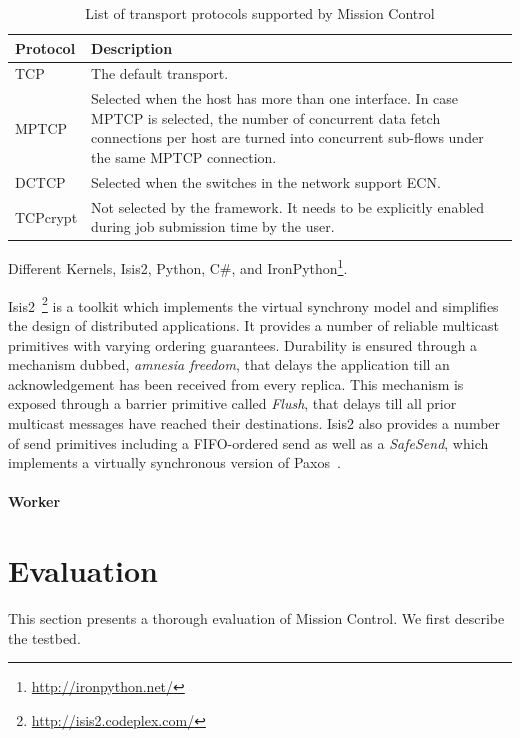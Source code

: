 \documentclass[a4paper,12pt,twoside,openright]{report}
\begin{document}
\begin{table}
  \centering
  \begin{tabularx}{5in}{|X|X|} 
    \hline
	\textbf{Protocol} & \textbf{Description} \\ \hline \hline
    TCP & The default transport. \\ \hline
    MPTCP & Selected when the host has more than one interface. In case MPTCP is
    selected, the number of concurrent data fetch connections per host are
    turned into concurrent sub-flows under the same MPTCP connection.
    \\ \hline 
    DCTCP & Selected when the switches in the network support ECN.
    \\ \hline
    TCPcrypt & Not selected by the framework. It needs to be explicitly enabled
    during job submission time by the user.
    \\
    \hline
 \end{tabularx} 
  \caption{List of transport protocols supported by Mission Control}
  \label{chap:implem:sec:ciel:tab:protocols}
\end{table}

Different Kernels, Isis2, Python, C\#, and
IronPython\footnote{\url{http://ironpython.net/}}.

Isis2~\cite{Birman:2012:OCW}\footnote{\url{http://isis2.codeplex.com/}} is a
toolkit which implements the virtual synchrony model and simplifies the design
of distributed applications. It provides a number of reliable multicast
primitives with varying ordering guarantees. Durability is ensured through a
mechanism dubbed, \emph{amnesia freedom}, that delays the application till an
acknowledgement has been received from every replica. This mechanism is exposed
through a barrier primitive called \emph{Flush}, that delays till all prior
multicast messages have reached their destinations. Isis2 also provides a number
of send primitives including a FIFO-ordered send as well as a \emph{SafeSend},
which implements a virtually synchronous version of
Paxos~\cite{Lamport:1998:PP}.

\subsubsection{Worker}\label{chap:implem:sec:ciel:subsec:workers}


\chapter{Evaluation}\label{chapter:evaluation}
This section presents a thorough evaluation of Mission Control. We first
describe the testbed.
\end{document}
